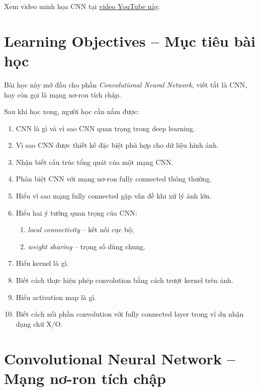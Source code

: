 Xem video minh họa CNN tại \href{https://www.youtube.com/watch?v=S3d_Hp3UiJI}{video YouTube này}.

\section*{Learning Objectives -- Mục tiêu bài học}

Bài học này mở đầu cho phần \textit{Convolutional Neural Network}, viết tắt là CNN, hay còn gọi là mạng nơ-ron tích chập.

Sau khi học xong, người học cần nắm được:

\begin{enumerate}[label=\arabic*.]
    \item CNN là gì và vì sao CNN quan trọng trong deep learning.
    \item Vì sao CNN được thiết kế đặc biệt phù hợp cho dữ liệu hình ảnh.
    \item Nhận biết cấu trúc tổng quát của một mạng CNN.
    \item Phân biệt CNN với mạng nơ-ron fully connected thông thường.
    \item Hiểu vì sao mạng fully connected gặp vấn đề khi xử lý ảnh lớn.
    \item Hiểu hai ý tưởng quan trọng của CNN:
    \begin{enumerate}
        \item \textit{local connectivity} -- kết nối cục bộ;
        \item \textit{weight sharing} -- trọng số dùng chung.
    \end{enumerate}
    \item Hiểu kernel là gì.
    \item Biết cách thực hiện phép convolution bằng cách trượt kernel trên ảnh.
    \item Hiểu activation map là gì.
    \item Biết cách nối phần convolution với fully connected layer trong ví dụ nhận dạng chữ X/O.
\end{enumerate}

\section{Convolutional Neural Network -- Mạng nơ-ron tích chập}

